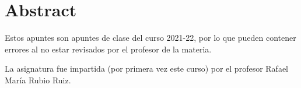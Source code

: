 \chapter*{Abstract}

Estos apuntes son apuntes de clase del curso 2021-22, por lo que pueden contener errores al no estar revisados por el profesor de la materia.


\noindent La asignatura fue impartida (por primera vez este curso) por el profesor Rafael María Rubio Ruiz.